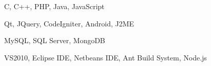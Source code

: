 

\begin{content}
	C, C++, PHP, Java, JavaScript
\end{content}


\begin{content}
	Qt, JQuery, CodeIgniter, Android, J2ME
\end{content}


\begin{content}
	MySQL, SQL Server, MongoDB
\end{content}


\begin{content}
	VS2010, Eclipse IDE, Netbeans IDE, Ant Build System, Node.js
\end{content}